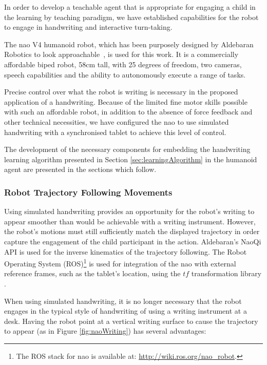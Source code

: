 \documentclass{article}
\begin{document}
In order to develop a teachable agent that is appropriate for engaging a child
in the learning by teaching paradigm, we have established capabilities for the
robot to engage in handwriting and interactive turn-taking.

The {\sc nao} V4 humanoid robot, which has been purposely designed by Aldebaran
Robotics to look approachable~\cite{Gouaillier2008}, is used for this work. It
is a commercially affordable biped robot, 58cm tall, with 25 degrees of freedom,
two cameras, speech capabilities and the ability to autonomously execute a range
of tasks.

Precise control over what the robot is writing is necessary in the proposed
application of a handwriting. Because of the limited fine motor skills possible
with such an affordable robot, in addition to the absence of force feedback and
other technical necessities, we have configured the {\sc nao} to use simulated
handwriting with a synchronised tablet to achieve this level of control. 

The development of the necessary components for embedding the handwriting
learning algorithm presented in Section \ref{sec:learningAlgorithm} in the
humanoid agent are presented in the sections which follow.

\subsubsection{Robot Trajectory Following Movements}

Using simulated handwriting provides an opportunity for the robot's writing to
appear smoother than would be achievable with a writing instrument. However, the
robot's motions must still sufficiently match the displayed trajectory in order
capture the engagement of the child participant in the action. Aldebaran's NaoQi
API is used for the inverse kinematics of the trajectory following. The Robot
Operating System (ROS)\footnote{The ROS stack for {\sc nao} is available at:
\url{http://wiki.ros.org/nao_robot}.} is used for integration of the {\sc nao}
with external reference frames, such as the tablet's location, using the $tf$
transformation library \cite{Foote2013}.

When using simulated handwriting, it is no longer necessary that the robot
engages in the typical style of handwriting of using a writing instrument at a
desk.  Having the robot point at a vertical writing surface to cause the
trajectory to appear (as in Figure \ref{fig:naoWriting}) has several advantages:
\end{document}
